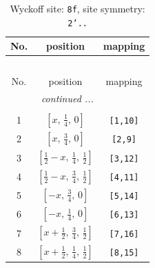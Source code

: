\documentclass[fleqn,8pt]{jsarticle}
\begin{document}
\begin{longtable}{ccc}
\caption{Wyckoff site: {\tt 8f}, site symmetry: {\tt 2'..}}
 \\
 \hline \hline
No. & position & mapping \\ \hline \endfirsthead

\multicolumn{2}{l}{\tablename\ \thetable{}} \\
 \hline \hline
No. & position & mapping \\ \hline \endhead

 \hline \hline
\multicolumn{2}{r}{\footnotesize\it continued ...} \\ \endfoot

 \hline \hline
\multicolumn{2}{r}{} \\ \endlastfoot

1 & $\left[ x,\, \frac{1}{4},\, 0 \right]$ & {\tt [1,10]} \\ \hline
2 & $\left[ x,\, \frac{3}{4},\, 0 \right]$ & {\tt [2,9]} \\ \hline
3 & $\left[ \frac{1}{2} - x,\, \frac{1}{4},\, \frac{1}{2} \right]$ & {\tt [3,12]} \\ \hline
4 & $\left[ \frac{1}{2} - x,\, \frac{3}{4},\, \frac{1}{2} \right]$ & {\tt [4,11]} \\ \hline
5 & $\left[ - x,\, \frac{3}{4},\, 0 \right]$ & {\tt [5,14]} \\ \hline
6 & $\left[ - x,\, \frac{1}{4},\, 0 \right]$ & {\tt [6,13]} \\ \hline
7 & $\left[ x + \frac{1}{2},\, \frac{3}{4},\, \frac{1}{2} \right]$ & {\tt [7,16]} \\ \hline
8 & $\left[ x + \frac{1}{2},\, \frac{1}{4},\, \frac{1}{2} \right]$ & {\tt [8,15]} \\
\end{longtable}
\renewcommand{\arraystretch}{1.2}
\end{document}
